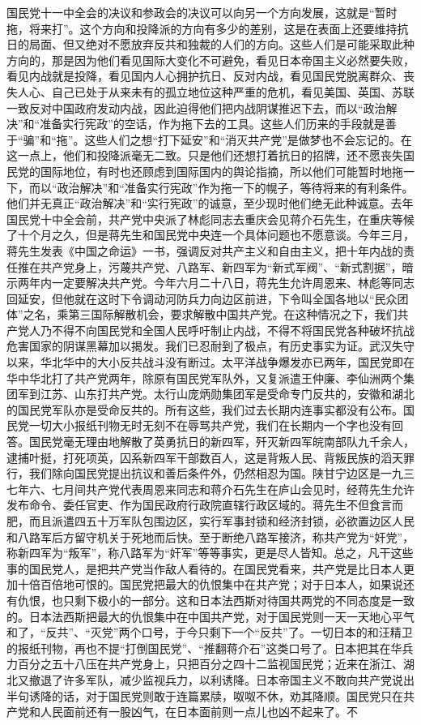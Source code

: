 国民党十一中全会的决议和参政会的决议可以向另一个方向发展，这就是“暂时拖，将来打”。这个方向和投降派的方向有多少的差别，这是在表面上还要维持抗日的局面、但又绝对不愿放弃反共和独裁的人们的方向。这些人们是可能采取此种方向的，那是因为他们看见国际大变化不可避免，看见日本帝国主义必然要失败，看见内战就是投降，看见国内人心拥护抗日、反对内战，看见国民党脱离群众、丧失人心、自己已处于从来未有的孤立地位这种严重的危机，看见美国、英国、苏联一致反对中国政府发动内战，因此迫得他们把内战阴谋推迟下去，而以“政治解决”和“准备实行宪政”的空话，作为拖下去的工具。这些人们历来的手段就是善于“骗”和“拖”。这些人们之想“打下延安”和“消灭共产党”是做梦也不会忘记的。在这一点上，他们和投降派毫无二致。只是他们还想打着抗日的招牌，还不愿丧失国民党的国际地位，有时也还顾虑到国际国内的舆论指摘，所以他们可能暂时地拖一下，而以“政治解决”和“准备实行宪政”作为拖一下的幌子，等待将来的有利条件。他们并无真正“政治解决”和“实行宪政”的诚意，至少现时他们绝无此种诚意。去年国民党十中全会前，共产党中央派了林彪同志去重庆会见蒋介石先生，在重庆等候了十个月之久，但是蒋先生和国民党中央连一个具体问题也不愿意谈。今年三月，蒋先生发表《中国之命运》一书，强调反对共产主义和自由主义，把十年内战的责任推在共产党身上，污蔑共产党、八路军、新四军为“新式军阀”、“新式割据”，暗示两年内一定要解决共产党。今年六月二十八日，蒋先生允许周恩来、林彪等同志回延安，但他就在这时下令调动河防兵力向边区前进，下令叫全国各地以“民众团体”之名，乘第三国际解散机会，要求解散中国共产党。在这种情况之下，我们共产党人乃不得不向国民党和全国人民呼吁制止内战，不得不将国民党各种破坏抗战危害国家的阴谋黑幕加以揭发。我们已忍耐到了极点，有历史事实为证。武汉失守以来，华北华中的大小反共战斗没有断过。太平洋战争爆发亦已两年，国民党即在华中华北打了共产党两年，除原有国民党军队外，又复派遣王仲廉、李仙洲两个集团军到江苏、山东打共产党。太行山庞炳勋集团军是受命专门反共的，安徽和湖北的国民党军队亦是受命反共的。所有这些，我们过去长期内连事实都没有公布。国民党一切大小报纸刊物无时无刻不在辱骂共产党，我们在长期内一个字也没有回答。国民党毫无理由地解散了英勇抗日的新四军，歼灭新四军皖南部队九千余人，逮捕叶挺，打死项英，囚系新四军干部数百人，这是背叛人民、背叛民族的滔天罪行，我们除向国民党提出抗议和善后条件外，仍然相忍为国。陕甘宁边区是一九三七年六、七月间共产党代表周恩来同志和蒋介石先生在庐山会见时，经蒋先生允许发布命令、委任官吏、作为国民政府行政院直辖行政区域的。蒋先生不但食言而肥，而且派遣四五十万军队包围边区，实行军事封锁和经济封锁，必欲置边区人民和八路军后方留守机关于死地而后快。至于断绝八路军接济，称共产党为“奸党”，称新四军为“叛军”，称八路军为“奸军”等等事实，更是尽人皆知。总之，凡干这些事的国民党人，是把共产党当作敌人看待的。在国民党看来，共产党是比日本人更加十倍百倍地可恨的。国民党把最大的仇恨集中在共产党；对于日本人，如果说还有仇恨，也只剩下极小的一部分。这和日本法西斯对待国共两党的不同态度是一致的。日本法西斯把最大的仇恨集中在中国共产党，对于国民党则一天一天地心平气和了，“反共”、“灭党”两个口号，于今只剩下一个“反共”了。一切日本的和汪精卫的报纸刊物，再也不提“打倒国民党”、“推翻蒋介石”这类口号了。日本把其在华兵力百分之五十八压在共产党身上，只把百分之四十二监视国民党；近来在浙江、湖北又撤退了许多军队，减少监视兵力，以利诱降。日本帝国主义不敢向共产党说出半句诱降的话，对于国民党则敢于连篇累牍，呶呶不休，劝其降顺。国民党只在共产党和人民面前还有一股凶气，在日本面前则一点儿也凶不起来了。不